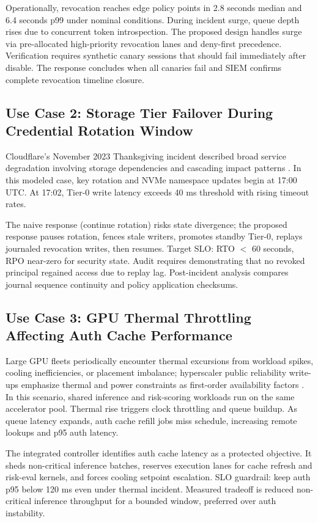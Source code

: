 \documentclass[12pt]{article}
\begin{document}
Operationally, revocation reaches edge policy points in 2.8 seconds median and 6.4 seconds p99 under nominal conditions. During incident surge, queue depth rises due to concurrent token introspection. The proposed design handles surge via pre-allocated high-priority revocation lanes and deny-first precedence. Verification requires synthetic canary sessions that should fail immediately after disable. The response concludes when all canaries fail and SIEM confirms complete revocation timeline closure.

\subsection{Use Case 2: Storage Tier Failover During Credential Rotation Window}
Cloudflare's November 2023 Thanksgiving incident described broad service degradation involving storage dependencies and cascading impact patterns \cite{cloudflare-thanksgiving-2023}. In this modeled case, key rotation and NVMe namespace updates begin at 17:00 UTC. At 17:02, Tier-0 write latency exceeds 40 ms threshold with rising timeout rates.

The naive response (continue rotation) risks state divergence; the proposed response pauses rotation, fences stale writers, promotes standby Tier-0, replays journaled revocation writes, then resumes. Target SLO: RTO $<$ 60 seconds, RPO near-zero for security state. Audit requires demonstrating that no revoked principal regained access due to replay lag. Post-incident analysis compares journal sequence continuity and policy application checksums.

\subsection{Use Case 3: GPU Thermal Throttling Affecting Auth Cache Performance}
Large GPU fleets periodically encounter thermal excursions from workload spikes, cooling inefficiencies, or placement imbalance; hyperscaler public reliability write-ups emphasize thermal and power constraints as first-order availability factors \cite{google-dc-reliability,meta-infra-reliability,nvidia-h100-whitepaper}. In this scenario, shared inference and risk-scoring workloads run on the same accelerator pool. Thermal rise triggers clock throttling and queue buildup. As queue latency expands, auth cache refill jobs miss schedule, increasing remote lookups and p95 auth latency.

The integrated controller identifies auth cache latency as a protected objective. It sheds non-critical inference batches, reserves execution lanes for cache refresh and risk-eval kernels, and forces cooling setpoint escalation. SLO guardrail: keep auth p95 below 120 ms even under thermal incident. Measured tradeoff is reduced non-critical inference throughput for a bounded window, preferred over auth instability.
\end{document}
